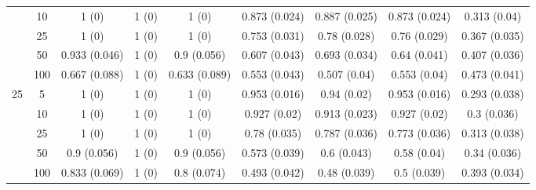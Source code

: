 \documentclass[10pt]{article}
\theoremstyle{definition}
\begin{document}
\begin{sidewaysfigure}
\begin{tabular}{cc|ccc|cccc}
  & 10  & 1 (0) & 1 (0) & 1 (0) & 0.873 (0.024) & 0.887 (0.025) & 0.873 (0.024) & 0.313 (0.04) \\ 
 & 25  & 1 (0) & 1 (0) & 1 (0) & 0.753 (0.031) & 0.78 (0.028) & 0.76 (0.029) & 0.367 (0.035) \\ 
  & 50  & 0.933 (0.046) & 1 (0) & 0.9 (0.056) & 0.607 (0.043) & 0.693 (0.034) & 0.64 (0.041) & 0.407 (0.036) \\ 
  & 100  & 0.667 (0.088) & 1 (0) & 0.633 (0.089) & 0.553 (0.043) & 0.507 (0.04) & 0.553 (0.04) & 0.473 (0.041) \\[.3cm]  
  \multirow{5}{*}{25} & 5  & 1 (0) & 1 (0) & 1 (0) & 0.953 (0.016) & 0.94 (0.02) & 0.953 (0.016) & 0.293 (0.038) \\ 
  & 10  & 1 (0) & 1 (0) & 1 (0) & 0.927 (0.02) & 0.913 (0.023) & 0.927 (0.02) & 0.3 (0.036) \\ 
  & 25  & 1 (0) & 1 (0) & 1 (0) & 0.78 (0.035) & 0.787 (0.036) & 0.773 (0.036) & 0.313 (0.038) \\ 
  & 50  & 0.9 (0.056) & 1 (0) & 0.9 (0.056) & 0.573 (0.039) & 0.6 (0.043) & 0.58 (0.04) & 0.34 (0.036) \\ 
    & 100  & 0.833 (0.069) & 1 (0) & 0.8 (0.074) & 0.493 (0.042) & 0.48 (0.039) & 0.5 (0.039) & 0.393 (0.034) \\ 
\end{tabular}
\end{sidewaysfigure}



\end{document}
